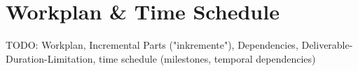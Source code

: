 \chapter{Workplan \& Time Schedule}
\label{ch:schedule}
TODO: Workplan, Incremental Parts ("inkremente"), Dependencies, Deliverable-Duration-Limitation, time schedule (milestones, temporal dependencies)